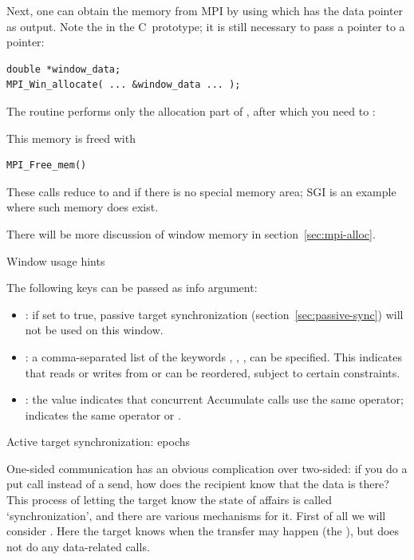 Next, one can obtain the memory from MPI by using
%
%
which has the data pointer as output. Note the  in the
C~prototype; it is still necessary to pass a pointer to a pointer:
\lstset{style=reviewcode,language=C}
\begin{lstlisting}
double *window_data;
MPI_Win_allocate( ... &window_data ... );
\end{lstlisting}
The routine  performs only the allocation
part of , after which you need to
:
%

This memory is freed with
\begin{lstlisting}
MPI_Free_mem()
\end{lstlisting}
These calls reduce to  and  if there is no special
memory area; SGI is an example where such memory does exist.

There will be more discussion of window memory in section~\ref{sec:mpi-alloc}.


 {Window usage hints}
\label{sec:window-info}

The following keys can be passed as info argument:
\begin{itemize}
\item {}: if set to true, passive target synchronization
  (section~\ref{sec:passive-sync}) will not be used on this window.
\item {}: a comma-separated list of
  the keywords , ,
  ,  can be specified. This
  indicates that reads or writes from  or
   can be reordered, subject to
  certain constraints.
\item {}: the value 
  indicates that concurrent Accumulate calls use the same operator;
   indicates the same operator or
  .
\end{itemize}

 {Active target synchronization: epochs}
\label{sec:fence}

One-sided communication has an obvious complication over two-sided: if
you do a put call instead of a send, how does the recipient know that
the data is there? This process of letting the target know the state
of affairs is called `synchronization', and there are various
mechanisms for it. First of all we will consider . Here the target knows when the transfer
may happen (the ), but does not do
any data-related calls.

